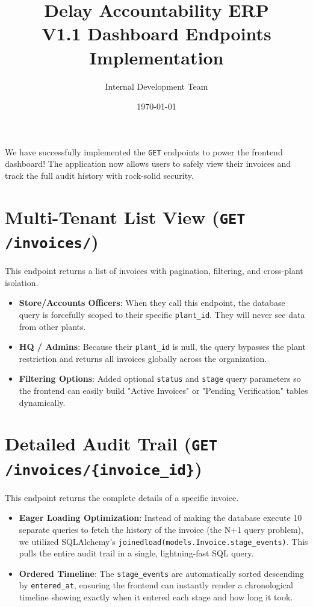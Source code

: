 \documentclass[11pt,a4paper]{article}
\title{\textbf{Delay Accountability ERP}\\ \Large V1.1 Dashboard Endpoints Implementation}
\author{Internal Development Team}
\date{\today}
\newcommand{\code}[1]{\colorbox{codebg}{\texttt{#1}}}
\begin{document}
\maketitle

\begin{tcolorbox}[colback=success!10, colframe=success, title=Executive Summary]
We have successfully implemented the \code{GET} endpoints to power the frontend dashboard! The application now allows users to safely view their invoices and track the full audit history with rock-solid security.
\end{tcolorbox}

\vspace{1em}

\section{Multi-Tenant List View (\code{GET /invoices/})}
This endpoint returns a list of invoices with pagination, filtering, and cross-plant isolation.

\begin{itemize}[leftmargin=*, itemsep=0.8em]
    \item \textbf{Store/Accounts Officers}: When they call this endpoint, the database query is forcefully scoped to their specific \code{plant\_id}. They will never see data from other plants.
    \item \textbf{HQ / Admins}: Because their \code{plant\_id} is null, the query bypasses the plant restriction and returns all invoices globally across the organization.
    \item \textbf{Filtering Options}: Added optional \code{status} and \code{stage} query parameters so the frontend can easily build "Active Invoices" or "Pending Verification" tables dynamically.
\end{itemize}

\section{Detailed Audit Trail (\code{GET /invoices/\{invoice\_id\}})}
This endpoint returns the complete details of a specific invoice.

\begin{itemize}[leftmargin=*, itemsep=0.8em]
    \item \textbf{Eager Loading Optimization}: Instead of making the database execute 10 separate queries to fetch the history of the invoice (the N+1 query problem), we utilized SQLAlchemy's \code{joinedload(models.Invoice.stage\_events)}. This pulls the entire audit trail in a single, lightning-fast SQL query.
    \item \textbf{Ordered Timeline}: The \code{stage\_events} are automatically sorted descending by \code{entered\_at}, ensuring the frontend can instantly render a chronological timeline showing exactly when it entered each stage and how long it took.
\end{itemize}
\end{document}
